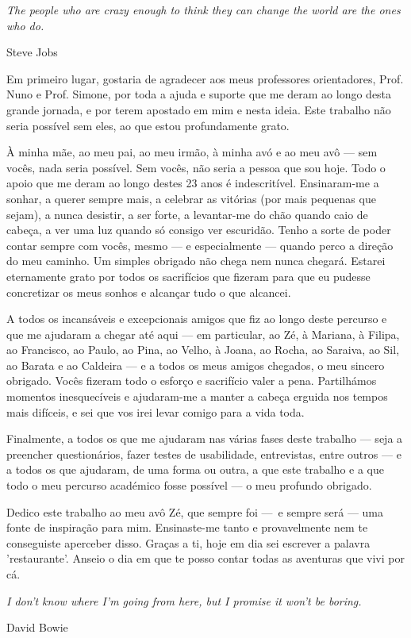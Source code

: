 
\epigraph{\textit{The people who are crazy enough to think they can change the world are the ones who do.}}{Steve Jobs}

\hfill \break

Em primeiro lugar, gostaria de agradecer aos meus professores orientadores, Prof. Nuno e Prof. Simone, por toda a ajuda e suporte que me deram ao longo desta grande jornada, e por terem apostado em mim e nesta ideia. Este trabalho não seria possível sem eles, ao que estou profundamente grato.

\hfill \break

À minha mãe, ao meu pai, ao meu irmão, à minha avó e ao meu avô — sem vocês, nada seria possível. Sem vocês, não seria a pessoa que sou hoje. Todo o apoio que me deram ao longo destes 23 anos é indescritível. Ensinaram-me a sonhar, a querer sempre mais, a celebrar as vitórias (por mais pequenas que sejam), a nunca desistir, a ser forte, a levantar-me do chão quando caio de cabeça, a ver uma luz quando só consigo ver escuridão. Tenho a sorte de poder contar sempre com vocês, mesmo — e especialmente — quando perco a direção do meu caminho. Um simples obrigado não chega nem nunca chegará. Estarei eternamente grato por todos os sacrifícios que fizeram para que eu pudesse concretizar os meus sonhos e alcançar tudo o que alcancei. 

\hfill \break

A todos os incansáveis e excepcionais amigos que fiz ao longo deste percurso e que me ajudaram a chegar até aqui — em particular, ao Zé, à Mariana, à Filipa, ao Francisco, ao Paulo, ao Pina, ao Velho, à Joana, ao Rocha, ao Saraiva, ao Sil, ao Barata e ao Caldeira — e a todos os meus amigos chegados, o meu sincero obrigado. Vocês fizeram todo o esforço e sacrifício valer a pena. Partilhámos momentos inesquecíveis e ajudaram-me a manter a cabeça erguida nos tempos mais difíceis, e sei que vos irei levar comigo para a vida toda.

\hfill \break

Finalmente, a todos os que me ajudaram nas várias fases deste trabalho — seja a preencher questionários, fazer testes de usabilidade, entrevistas, entre outros — e a todos os que ajudaram, de uma forma ou outra, a que este trabalho e a que todo o meu percurso académico fosse possível — o meu profundo obrigado.

\hfill \break

Dedico este trabalho ao meu avô Zé, que sempre foi — e sempre será — uma fonte de inspiração para mim. Ensinaste-me tanto e provavelmente nem te conseguiste aperceber disso. Graças a ti, hoje em dia sei escrever a palavra 'restaurante'. Anseio o dia em que te posso contar todas as aventuras que vivi por cá.

\hfill \break


\epigraph{\textit{I don't know where I'm going from here, but I promise it won't be boring.}}{David Bowie}

\newpage